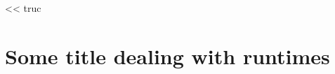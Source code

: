 \begin{savequote}[6cm]
<< truc
\end{savequote}

\chapter{Some title dealing with runtimes}\label{chap:contrib:runtime}
\chaptertoc


